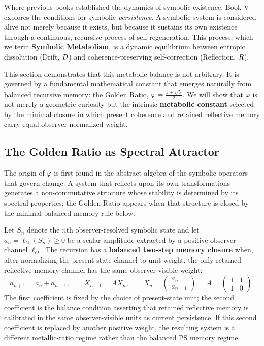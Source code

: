 Where previous books established the dynamics of symbolic existence, Book V explores the conditions for symbolic \emph{persistence}. A symbolic system is considered alive not merely because it exists, but because it sustains its own existence through a continuous, recursive process of self-regeneration. This process, which we term \textbf{Symbolic Metabolism}, is a dynamic equilibrium between entropic dissolution (Drift, $D$) and coherence-preserving self-correction (Reflection, $R$).

This section demonstrates that this metabolic balance is not arbitrary. It is governed by a fundamental mathematical constant that emerges naturally from balanced recursive memory: the Golden Ratio, $\varphi = \frac{1 + \sqrt{5}}{2}$. We will show that $\varphi$ is not merely a geometric curiosity but the intrinsic \textbf{metabolic constant} selected by the minimal closure in which present coherence and retained reflective memory carry equal observer-normalized weight.

\subsection{The Golden Ratio as Spectral Attractor}
\label{subsec:bk5_golden_ratio_spectral_attractor}

The origin of $\varphi$ is first found in the abstract algebra of the symbolic operators that govern change. A system that reflects upon its own transformations generates a non-commutative structure whose stability is determined by its spectral properties; the Golden Ratio appears when that structure is closed by the minimal balanced memory rule below.

\begin{definition}
\label{definition:bk5_balanced_two_step_memory_closure}
Let $S_n$ denote the $n$th observer-resolved symbolic state and let
$a_n=\ell_O(S_n)\geq 0$ be a scalar amplitude extracted by a positive
observer channel $\ell_O$.  The recursion has a \textbf{balanced two-step memory
closure} when, after normalizing the present-state channel to unit weight, the
only retained reflective memory channel has the same observer-visible weight:
\[
a_{n+1}=a_n+a_{n-1}, \qquad
X_{n+1}=A X_n,\qquad
X_n=\begin{pmatrix}a_n\\ a_{n-1}\end{pmatrix},\quad
A=\begin{pmatrix}1&1\\1&0\end{pmatrix}.
\]
The first coefficient is fixed by the choice of present-state unit; the second
coefficient is the balance condition asserting that retained reflective memory is
calibrated in the same observer-visible units as current persistence.  If this
second coefficient is replaced by another positive weight, the resulting system
is a different metallic-ratio regime rather than the balanced PS memory regime.
\end{definition}

